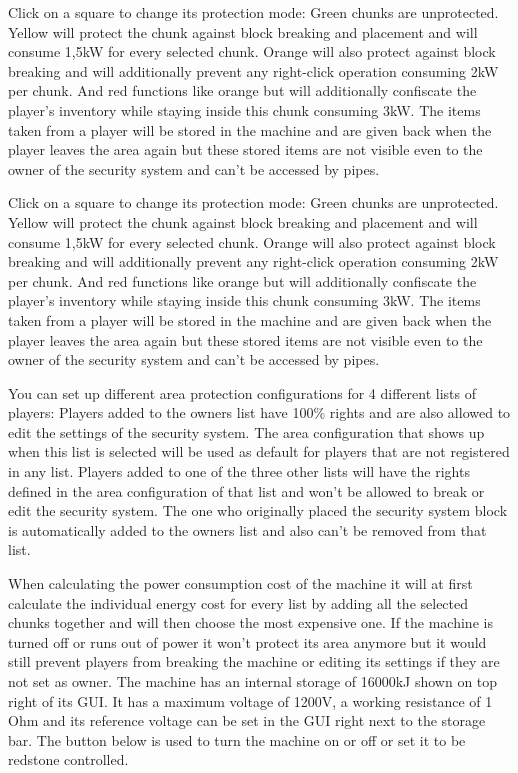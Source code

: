 \documentclass[11pt]{article} %
\begin{document}
Click on a square to change its protection mode: Green chunks are unprotected. Yellow will protect the chunk against block breaking and placement and will consume 1,5kW for every selected chunk. Orange will also protect against block breaking and will additionally prevent any right-click operation consuming 2kW per chunk. And red functions like orange but will additionally confiscate the player's inventory while staying inside this chunk consuming 3kW. The items taken from a player will be stored in the machine and are given back when the player leaves the area again but these stored items are not visible even to the owner of the security system and can't be accessed by pipes.

Click on a square to change its protection mode: Green chunks are unprotected. Yellow will protect the chunk against block breaking and placement and will consume 1,5kW for every selected chunk. Orange will also protect against block breaking and will additionally prevent any right-click operation consuming 2kW per chunk. And red functions like orange but will additionally confiscate the player's inventory while staying inside this chunk consuming 3kW. The items taken from a player will be stored in the machine and are given back when the player leaves the area again but these stored items are not visible even to the owner of the security system and can't be accessed by pipes.

You can set up different area protection configurations for 4 different lists of players: Players added to the owners list have 100\% rights and are also allowed to edit the settings of the security system. The area configuration that shows up when this list is selected will be used as default for players that are not registered in any list. Players added to one of the three other lists will have the rights defined in the area configuration of that list and won't be allowed to break or edit the security system. The one who originally placed the security system block is automatically added to the owners list and also can't be removed from that list.

When calculating the power consumption cost of the machine it will at first calculate the individual energy cost for every list by adding all the selected chunks together and will then choose the most expensive one. If the machine is turned off or runs out of power it won't protect its area anymore but it would still prevent players from breaking the machine or editing its settings if they are not set as owner. The machine has an internal storage of 16000kJ shown on top right of its GUI. It has a maximum voltage of 1200V, a working resistance of 1 Ohm and its reference voltage can be set in the GUI right next to the storage bar. The button below is used to turn the machine on or off or set it to be redstone controlled.
\end{document}
